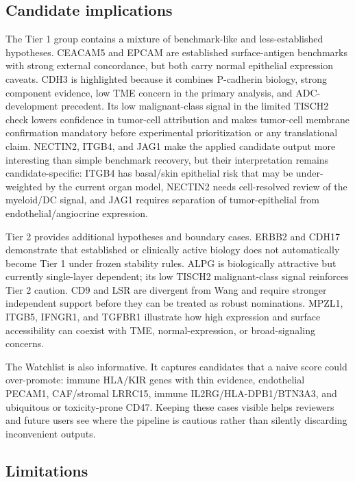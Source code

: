 \documentclass[twocolumn]{article}
\begin{document}
\subsection{Candidate implications}

The Tier 1 group contains a mixture of benchmark-like and less-established hypotheses. CEACAM5 and EPCAM are established surface-antigen benchmarks with strong external concordance, but both carry normal epithelial expression caveats. CDH3 is highlighted because it combines P-cadherin biology, strong component evidence, low TME concern in the primary analysis, and ADC-development precedent. Its low malignant-class signal in the limited TISCH2 check lowers confidence in tumor-cell attribution and makes tumor-cell membrane confirmation mandatory before experimental prioritization or any translational claim. NECTIN2, ITGB4, and JAG1 make the applied candidate output more interesting than simple benchmark recovery, but their interpretation remains candidate-specific: ITGB4 has basal/\allowbreak{}skin epithelial risk that may be under-weighted by the current organ model, NECTIN2 needs cell-resolved review of the myeloid/\allowbreak{}DC signal, and JAG1 requires separation of tumor-epithelial from endothelial/\allowbreak{}angiocrine expression.

Tier 2 provides additional hypotheses and boundary cases. ERBB2 and CDH17 demonstrate that established or clinically active biology does not automatically become Tier 1 under frozen stability rules. ALPG is biologically attractive but currently single-layer dependent; its low TISCH2 malignant-class signal reinforces Tier 2 caution. CD9 and LSR are divergent from Wang and require stronger independent support before they can be treated as robust nominations. MPZL1, ITGB5, IFNGR1, and TGFBR1 illustrate how high expression and surface accessibility can coexist with TME, normal-expression, or broad-signaling concerns.

The Watchlist is also informative. It captures candidates that a naive score could over-promote: immune HLA/\allowbreak{}KIR genes with thin evidence, endothelial PECAM1, CAF/\allowbreak{}stromal LRRC15, immune IL2RG/\allowbreak{}HLA-DPB1/\allowbreak{}BTN3A3, and ubiquitous or toxicity-prone CD47. Keeping these cases visible helps reviewers and future users see where the pipeline is cautious rather than silently discarding inconvenient outputs.

\subsection{Limitations}
\end{document}
